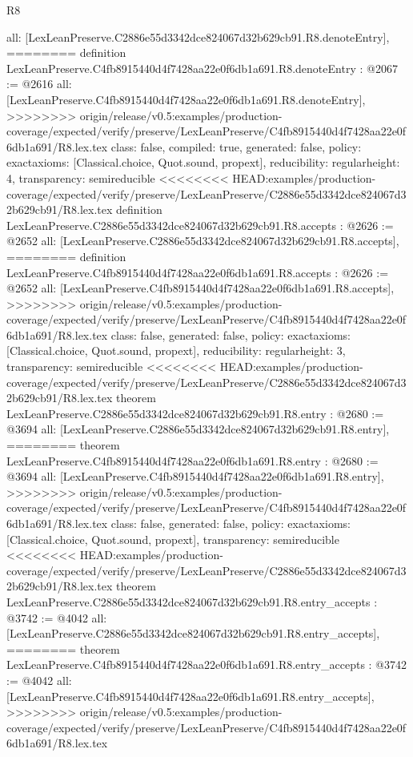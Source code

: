 \begin{lexlean}{R8}
\begin{coremodule}
{{{{{{{{{{{{{{{{{{{{{{{{{{{{{{{{{{{{  all: [LexLeanPreserve.C2886e55d3342dce824067d32b629cb91.R8.denoteEntry],
========
definition LexLeanPreserve.C4fb8915440d4f7428aa22e0f6db1a691.R8.denoteEntry : @2067 := @2616 {
  all: [LexLeanPreserve.C4fb8915440d4f7428aa22e0f6db1a691.R8.denoteEntry],
>>>>>>>> origin/release/v0.5:examples/production-coverage/expected/verify/preserve/LexLeanPreserve/C4fb8915440d4f7428aa22e0f6db1a691/R8.lex.tex
  class: false,
  compiled: true,
  generated: false,
  policy: exact{axioms: [Classical.choice, Quot.sound, propext]},
  reducibility: regular{height: 4},
  transparency: semireducible
}
<<<<<<<< HEAD:examples/production-coverage/expected/verify/preserve/LexLeanPreserve/C2886e55d3342dce824067d32b629cb91/R8.lex.tex
definition LexLeanPreserve.C2886e55d3342dce824067d32b629cb91.R8.accepts : @2626 := @2652 {
  all: [LexLeanPreserve.C2886e55d3342dce824067d32b629cb91.R8.accepts],
========
definition LexLeanPreserve.C4fb8915440d4f7428aa22e0f6db1a691.R8.accepts : @2626 := @2652 {
  all: [LexLeanPreserve.C4fb8915440d4f7428aa22e0f6db1a691.R8.accepts],
>>>>>>>> origin/release/v0.5:examples/production-coverage/expected/verify/preserve/LexLeanPreserve/C4fb8915440d4f7428aa22e0f6db1a691/R8.lex.tex
  class: false,
  generated: false,
  policy: exact{axioms: [Classical.choice, Quot.sound, propext]},
  reducibility: regular{height: 3},
  transparency: semireducible
}
<<<<<<<< HEAD:examples/production-coverage/expected/verify/preserve/LexLeanPreserve/C2886e55d3342dce824067d32b629cb91/R8.lex.tex
theorem LexLeanPreserve.C2886e55d3342dce824067d32b629cb91.R8.entry : @2680 := @3694 {
  all: [LexLeanPreserve.C2886e55d3342dce824067d32b629cb91.R8.entry],
========
theorem LexLeanPreserve.C4fb8915440d4f7428aa22e0f6db1a691.R8.entry : @2680 := @3694 {
  all: [LexLeanPreserve.C4fb8915440d4f7428aa22e0f6db1a691.R8.entry],
>>>>>>>> origin/release/v0.5:examples/production-coverage/expected/verify/preserve/LexLeanPreserve/C4fb8915440d4f7428aa22e0f6db1a691/R8.lex.tex
  class: false,
  generated: false,
  policy: exact{axioms: [Classical.choice, Quot.sound, propext]},
  transparency: semireducible
}
<<<<<<<< HEAD:examples/production-coverage/expected/verify/preserve/LexLeanPreserve/C2886e55d3342dce824067d32b629cb91/R8.lex.tex
theorem LexLeanPreserve.C2886e55d3342dce824067d32b629cb91.R8.entry_accepts : @3742 := @4042 {
  all: [LexLeanPreserve.C2886e55d3342dce824067d32b629cb91.R8.entry_accepts],
========
theorem LexLeanPreserve.C4fb8915440d4f7428aa22e0f6db1a691.R8.entry_accepts : @3742 := @4042 {
  all: [LexLeanPreserve.C4fb8915440d4f7428aa22e0f6db1a691.R8.entry_accepts],
>>>>>>>> origin/release/v0.5:examples/production-coverage/expected/verify/preserve/LexLeanPreserve/C4fb8915440d4f7428aa22e0f6db1a691/R8.lex.tex
}}}}}}}}}}}}}}}}}}}}}}}}}}}}}}}}}}}}}}}}
\end{coremodule}
\end{lexlean}
